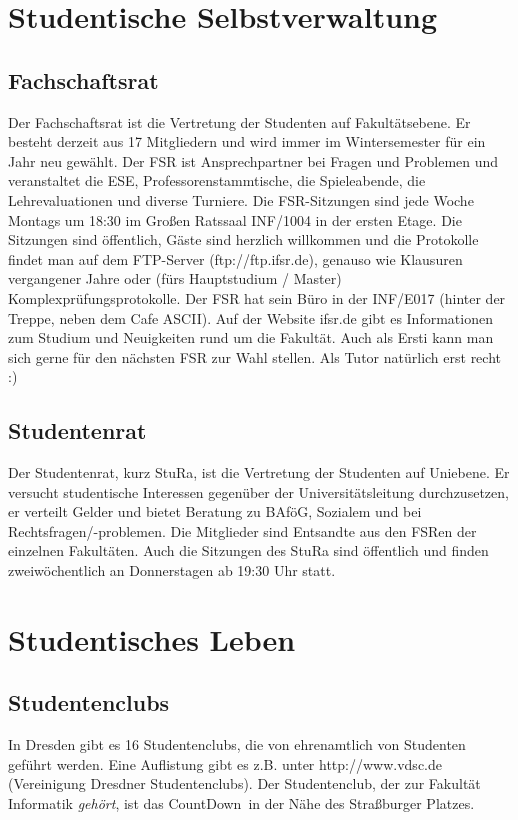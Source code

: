 \documentclass[a4paper,12pt]{report}
\begin{document}
\section{Studentische Selbstverwaltung}
\subsection{Fachschaftsrat}
Der Fachschaftsrat ist die Vertretung der Studenten auf Fakultätsebene. Er besteht derzeit aus 17 Mitgliedern und wird immer im Wintersemester für ein Jahr neu gewählt. Der FSR ist Ansprechpartner bei Fragen und Problemen und veranstaltet die ESE, Professorenstammtische, die Spieleabende, die Lehrevaluationen und diverse Turniere. Die FSR-Sitzungen sind jede Woche Montags um 18:30 im Großen Ratssaal INF/1004 in der ersten Etage. Die Sitzungen sind öffentlich, Gäste sind herzlich willkommen und die Protokolle findet man auf dem FTP-Server (ftp://ftp.ifsr.de), genauso wie Klausuren vergangener Jahre oder (fürs Hauptstudium / Master) Komplexprüfungsprotokolle. Der FSR hat sein Büro in der INF/E017 (hinter der Treppe, neben dem Cafe ASCII). Auf der Website ifsr.de gibt es Informationen zum Studium und Neuigkeiten rund um die Fakultät. Auch als Ersti kann man sich gerne für den nächsten FSR zur Wahl stellen. Als Tutor natürlich erst recht :)

\subsection{Studentenrat}
Der Studentenrat, kurz StuRa, ist die Vertretung der Studenten auf Uniebene. Er versucht studentische Interessen gegenüber der Universitätsleitung durchzusetzen, er verteilt Gelder und bietet Beratung zu BAföG, Sozialem und bei Rechtsfragen/-problemen. Die Mitglieder sind Entsandte aus den FSRen der einzelnen Fakultäten. Auch die Sitzungen des StuRa sind öffentlich und finden zweiwöchentlich an Donnerstagen ab 19:30 Uhr statt.

\section{Studentisches Leben}
\subsection{Studentenclubs}
In Dresden gibt es 16 Studentenclubs, die von ehrenamtlich von Studenten geführt werden. Eine Auflistung gibt es z.B. unter http://www.vdsc.de (Vereinigung Dresdner Studentenclubs). Der Studentenclub, der zur Fakultät Informatik \textit{gehört}, ist das \glqq CountDown\grqq\ in der Nähe des Straßburger Platzes.
\end{document}
